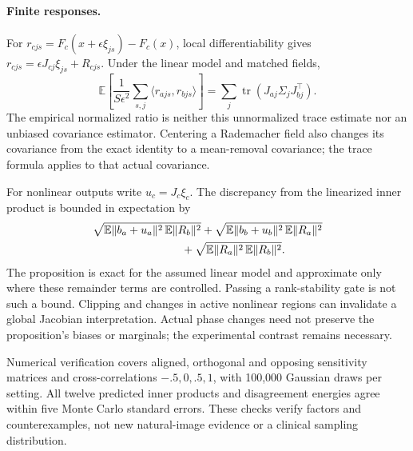 \paragraph{Finite responses.}
For $r_{cjs}=F_c(x+\epsilon\xi_{js})-F_c(x)$, local differentiability gives $r_{cjs}=\epsilon J_{cj}\xi_{js}+R_{cjs}$. Under the linear model and matched fields,
\begin{equation}
\mathbb E\left[\frac{1}{S\epsilon^2}\sum_{s,j}\langle r_{ajs},r_{bjs}\rangle\right]
=\sum_j\operatorname{tr}(J_{aj}\Sigma_jJ_{bj}^\top).
\end{equation}
The empirical normalized ratio is neither this unnormalized trace estimate nor an unbiased covariance estimator. Centering a Rademacher field also changes its covariance from the exact identity to a mean-removal covariance; the trace formula applies to that actual covariance.

For nonlinear outputs write $u_c=J_c\xi_c$. The discrepancy from the linearized inner product is bounded in expectation by
\begin{align}
&\sqrt{\mathbb E\|b_a+u_a\|^2\,\mathbb E\|R_b\|^2}
+\sqrt{\mathbb E\|b_b+u_b\|^2\,\mathbb E\|R_a\|^2}\nonumber\\
&\hspace{28mm}+\sqrt{\mathbb E\|R_a\|^2\,\mathbb E\|R_b\|^2}.
\end{align}
The proposition is exact for the assumed linear model and approximate only where these remainder terms are controlled. Passing a rank-stability gate is not such a bound. Clipping and changes in active nonlinear regions can invalidate a global Jacobian interpretation. Actual phase changes need not preserve the proposition's biases or marginals; the experimental contrast remains necessary.

Numerical verification covers aligned, orthogonal and opposing sensitivity matrices and cross-correlations $-.5,0,.5,1$, with 100,000 Gaussian draws per setting. All twelve predicted inner products and disagreement energies agree within five Monte Carlo standard errors. These checks verify factors and counterexamples, not new natural-image evidence or a clinical sampling distribution.

